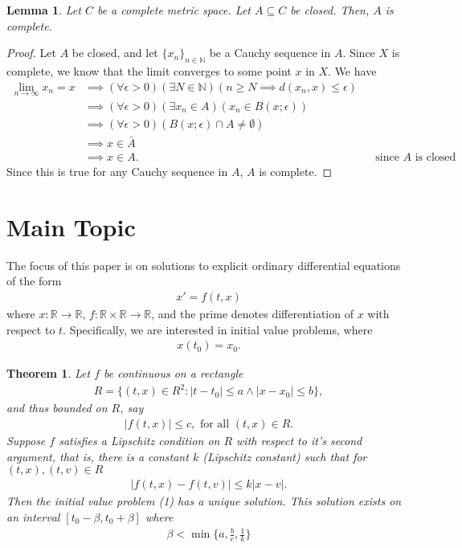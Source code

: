 \documentclass[10pt,a4paper]{article}
\theoremstyle{theorem}
\newtheorem{theorem}{Theorem}
\newtheorem{lemma}{Lemma}
\theoremstyle{definition}
\begin{document}
\begin{lemma}
Let $C$ be a complete metric space. Let $A \subseteq C$ be closed. Then, $A$ is complete.
\end{lemma}

\begin{proof}
Let $A$ be closed, and let $\{x_n\}_{n \in \mathbb{N}}$ be a Cauchy sequence in $A$.  Since $X$ is complete, we know that the limit converges to some point $x$ in $X$.  We have
\begin{align*}
\lim_{n \to \infty} x_n = x &\implies (\forall \epsilon > 0)(\exists N \in \mathbb{N})(n \geq N \implies d(x_n, x) \leq \epsilon)\\
&\implies (\forall \epsilon > 0)(\exists x_n \in A)(x_n \in B(x; \epsilon))\\
&\implies (\forall \epsilon > 0)(B(x; \epsilon) \cap A \not = \emptyset)\\
&\implies x \in \bar{A}\\
&\implies x \in A. && \text{since } A \text{ is closed}
\end{align*}
Since this is true for any Cauchy sequence in $A$, $A$ is complete.
\end{proof}

\section{Main Topic}
The focus of this paper is on solutions to explicit ordinary differential equations of the form
\begin{align}
x' = f(t, x)
\end{align}
where $x: \mathbb{R} \to \mathbb{R}$, $f: \mathbb{R} \times \mathbb{R} \to \mathbb{R}$, and the prime denotes differentiation of $x$ with respect to $t$.  Specifically, we are interested in initial value problems, where
\begin{align*}
x(t_0) = x_0.
\end{align*}

\begin{theorem}
Let $f$ be continuous on a rectangle 
\begin{align*}
R = \{(t, x) \mathbb \in {R}^2 : |t - t_0| \leq a \land |x - x_0| \leq b \},
\end{align*}
and thus bounded on $R$, say
\begin{align}
|f(t, x)| \leq c, \text{ for all } (t, x) \in R.
\end{align}
Suppose $f$ satisfies a Lipschitz condition on $R$ with respect to it's second argument, that is, there is a constant $k$ (Lipschitz constant) such that for $(t, x), (t, v) \in R$
\begin{align}
|f(t, x) - f(t, v)| \leq k |x - v|.
\end{align}
Then the initial value problem (1) has a unique solution. This solution exists on an interval $[t_0 - \beta, t_0 + \beta]$ where 
\begin{align}
\beta < \min \Bigg \{a, \frac{b}{c}, \frac{1}{k} \Bigg \}
\end{align}
\end{theorem}
\end{document}

